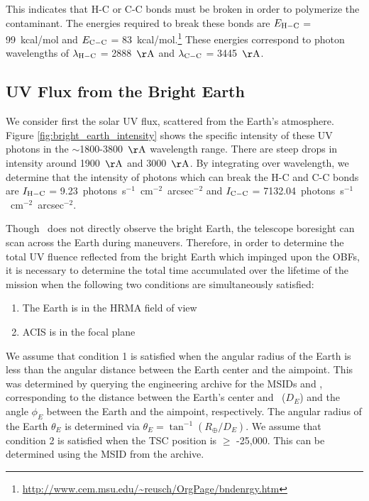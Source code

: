 \documentclass[11pt]{article}
\begin{document}
This indicates that H-C or C-C bonds must be broken in order to polymerize the contaminant. The
energies required to break these bonds are $E_{\rm H-C}$ = 99~kcal/mol and $E_{\rm C-C}$ =
83~kcal/mol.\footnote{\url{http://www.cem.msu.edu/~reusch/OrgPage/bndenrgy.htm}} These energies
correspond to photon wavelengths of $\lambda_{\rm H-C}$ = 2888~${\rm \AA}$ and $\lambda_{\rm C-C}$
= 3445~${\rm \AA}$.

\subsection{UV Flux from the Bright Earth}
We consider first the solar UV flux, scattered from the Earth's atmosphere. Figure
\ref{fig:bright_earth_intensity} shows the specific intensity of these UV photons in
the $\sim$1800-3800~${\rm \AA}$ wavelength range. There are steep drops in intensity
around 1900~${\rm \AA}$ and 3000~${\rm \AA}$. By integrating over wavelength, we
determine that the intensity of photons which can break the H-C and C-C bonds are
$I_{\rm H-C}$ = 9.23~photons~s$^{-1}$~cm$^{-2}$~arcsec$^{-2}$ and $I_{\rm C-C}$ =
7132.04~photons~s$^{-1}$~cm$^{-2}$~arcsec$^{-2}$.

Though \chandra~does not directly observe the bright Earth, the telescope boresight can scan
across the Earth during maneuvers. Therefore, in order to determine the total UV fluence
reflected from the bright Earth which impinged upon the OBFs, it is necessary to determine
the total time accumulated over the lifetime of the mission when the following two conditions
are simultaneously satisfied:

\begin{enumerate}
\item The Earth is in the HRMA field of view
\item ACIS is in the focal plane
\end{enumerate}

We assume that condition 1 is satisfied when the angular radius of the Earth is less than the
angular distance between the Earth center and the aimpoint. This was determined by querying
the  engineering archive for the MSIDs  and ,
corresponding to the distance between the Earth's center and \chandra~($D_E$) and the angle $\phi_E$ between
the Earth and the aimpoint, respectively. The angular radius of the Earth $\theta_E$ is determined
via $\theta_E = \tan^{-1} (R_\oplus/D_E)$. We assume that condition 2 is satisfied when the TSC
position is $\geq$ -25,000. This can be determined using the MSID  from the 
archive.
\end{document}
